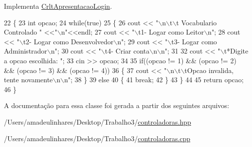 Implementa \mbox{\hyperlink{class_crlt_apresentacao_login_a76226b00329c638d6de95458ad87756e}{Crlt\+Apresentacao\+Login}}.


\begin{DoxyCode}
22 \{
23   \textcolor{keywordtype}{int} opcao;
24   \textcolor{keywordflow}{while}(\textcolor{keyword}{true})
25   \{
26     cout <<    \textcolor{stringliteral}{"\(\backslash\)n\(\backslash\)t\(\backslash\)t Vocabulario Controlado "}   <<\textcolor{stringliteral}{"\(\backslash\)n"}<<endl;
27     cout << \textcolor{stringliteral}{"\(\backslash\)t1- Logar como Leitor\(\backslash\)n"};
28     cout << \textcolor{stringliteral}{"\(\backslash\)t2- Logar como Desenvolvedor\(\backslash\)n"};
29     cout << \textcolor{stringliteral}{"\(\backslash\)t3- Logar como Administrador\(\backslash\)n"};
30     cout << \textcolor{stringliteral}{"\(\backslash\)t4- Criar conta\(\backslash\)n\(\backslash\)n"};
31 
32     cout << \textcolor{stringliteral}{"\(\backslash\)t*Digite a opcao escolhida: "};
33     cin >> opcao;
34 
35     \textcolor{keywordflow}{if}((opcao != 1) && (opcao != 2) && (opcao != 3) && (opcao != 4))
36     \{
37       cout << \textcolor{stringliteral}{"\(\backslash\)n\(\backslash\)t\(\backslash\)tOpcao invalida, tente novamente\(\backslash\)n\(\backslash\)n"};
38     \}
39     \textcolor{keywordflow}{else}
40     \{
41       \textcolor{keywordflow}{break};
42     \}
43   \}
44 
45   \textcolor{keywordflow}{return} opcao;
46 \}
\end{DoxyCode}


A documentação para essa classe foi gerada a partir dos seguintes arquivos\+:\begin{DoxyCompactItemize}
\item 
/\+Users/amadeulinhares/\+Desktop/\+Trabalho3/\mbox{\hyperlink{controladoras_8hpp}{controladoras.\+hpp}}\item 
/\+Users/amadeulinhares/\+Desktop/\+Trabalho3/\mbox{\hyperlink{controladoras_8cpp}{controladoras.\+cpp}}\end{DoxyCompactItemize}
